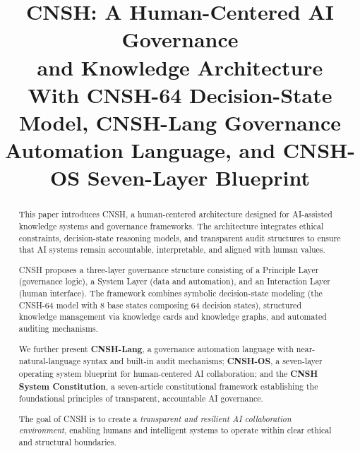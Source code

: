 \documentclass[conference]{IEEEtran}
\begin{document}

\title{\textbf{CNSH: A Human-Centered AI Governance\\
and Knowledge Architecture}\\
{\large With CNSH-64 Decision-State Model, CNSH-Lang Governance\\
Automation Language, and CNSH-OS Seven-Layer Blueprint}}

\author{
}

\maketitle

\begin{abstract}
This paper introduces CNSH, a human-centered architecture designed for
AI-assisted knowledge systems and governance frameworks.
The architecture integrates ethical constraints, decision-state
reasoning models, and transparent audit structures to ensure that AI
systems remain accountable, interpretable, and aligned with human values.

CNSH proposes a three-layer governance structure consisting of a
Principle Layer (governance logic), a System Layer (data and automation),
and an Interaction Layer (human interface).
The framework combines symbolic decision-state modeling
(the CNSH-64 model with 8 base states composing 64 decision states),
structured knowledge management via knowledge cards and knowledge graphs,
and automated auditing mechanisms.

We further present \textbf{CNSH-Lang}, a governance automation language
with near-natural-language syntax and built-in audit mechanisms;
\textbf{CNSH-OS}, a seven-layer operating system blueprint for
human-centered AI collaboration; and the \textbf{CNSH System Constitution},
a seven-article constitutional framework establishing
the foundational principles of transparent, accountable AI governance.

The goal of CNSH is to create a \emph{transparent and resilient AI
collaboration environment}, enabling humans and intelligent systems
to operate within clear ethical and structural boundaries.
\end{abstract}
\end{document}
